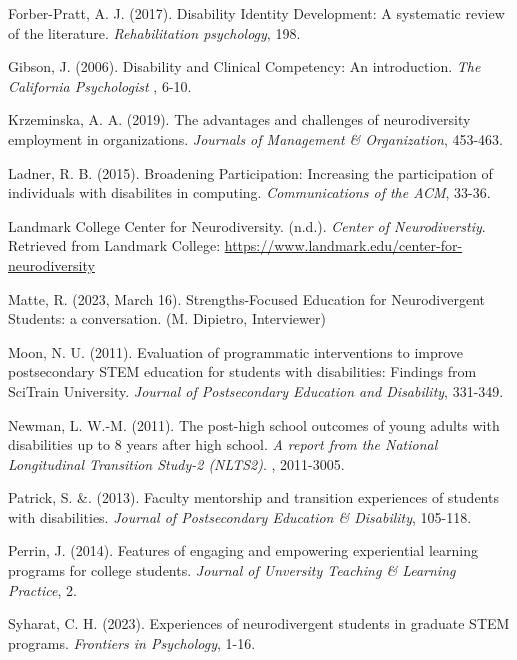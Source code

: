 \documentclass[11.5pt]{sig-alternate}
\begin{document}
\begin{large}
Forber-Pratt, A. J. (2017). Disability Identity Development: A systematic review of the literature. \textit{Rehabilitation psychology}, 198.

Gibson, J. (2006). Disability and Clinical Competency: An introduction. \textit{The California Psychologist} , 6-10.

Krzeminska, A. A. (2019). The advantages and challenges of neurodiversity employment in organizations. \textit{Journals of Management \& Organization}, 453-463.

Ladner, R. B. (2015). Broadening Participation: Increasing the participation of individuals with disabilites in computing. \textit{Communications of the ACM}, 33-36.

Landmark College Center for Neurodiversity. (n.d.). \textit{Center of Neurodiverstiy}. Retrieved from Landmark College: \url{https://www.landmark.edu/center-for-neurodiversity}

Matte, R. (2023, March 16). Strengths-Focused Education for Neurodivergent Students: a conversation. (M. Dipietro, Interviewer)

Moon, N. U. (2011). Evaluation of programmatic interventions to improve postsecondary STEM education for students with disabilities: Findings from SciTrain University. \textit{Journal of Postsecondary Education and Disability}, 331-349.

Newman, L. W.-M. (2011). The post-high school outcomes of young adults with disabilities up to 8 years after high school. \textit{A report from the National Longitudinal Transition Study-2 (NLTS2)}. , 2011-3005.

Patrick, S. \&. (2013). Faculty mentorship and transition experiences of students with disabilities. \textit{Journal of Postsecondary Education \& Disability}, 105-118.

Perrin, J. (2014). Features of engaging and empowering experiential learning programs for college students. \textit{Journal of Unversity Teaching \& Learning Practice}, 2.

Syharat, C. H. (2023). Experiences of neurodivergent students in graduate STEM programs. \textit{Frontiers in Psychology}, 1-16.

\end{large}
\end{document}
